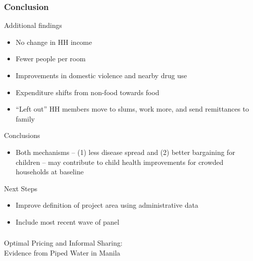 \documentclass[aspectratio=149]{beamer}
\begin{document}
\begin{frame}
\frametitle{Conclusion}

Additional findings
\begin{itemize}
  \item No change in HH income
  \item Fewer people per room
  \item Improvements in domestic violence and nearby drug use
  \item Expenditure shifts from non-food towards food
  \item ``Left out'' HH members move to slums, work more, and send remittances to family
\end{itemize}
\vspace{.1cm}
Conclusions
\begin{itemize}
  \item Both mechanisms -- (1) less disease spread and (2) better bargaining for children -- may contribute to child health improvements for crowded households at baseline
\end{itemize}

\vspace{.1cm}
Next Steps
\begin{itemize}
  \item Improve definition of project area using administrative data
  \item Include most recent wave of panel
\end{itemize}

\end{frame}







\begin{frame}
\frametitle{}
\centering
{\Large \color{darkred} Optimal Pricing and Informal Sharing: \\ \vspace{.1cm} Evidence from Piped Water in Manila} 
\end{frame}

\end{document}
